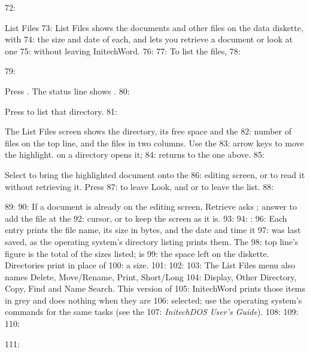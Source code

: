72: \begin{Feature}{List Files}
73: List Files shows the documents and other files on the data diskette, with
74: the size and date of each, and lets you retrieve a document or look at one
75: without leaving InitechWord.
76: 
77: To list the files,
78: \begin{WPSteps}
79: \item Press .  The status line shows .
80: \item Press  to list that directory.
81: \item The List Files screen shows the directory, its free space and the
82: number of files on the top line, and the files in two columns.  Use the
83: arrow keys to move the highlight.   on a directory opens it;
84:  returns to the one above.
85: \item Select  to bring the highlighted document onto the
86: editing screen, or  to read it without retrieving it.  Press
87:  to leave Look, and  or  to leave the list.
88: \end{WPSteps}
89: 
90: If a document is already on the editing screen, Retrieve asks ; answer  to add the file at the
92: cursor, or  to keep the screen as it is.
93: 
94: : 
96: Each entry prints the file name, its size in bytes, and the date and time it
97: was last saved, as the operating system's directory listing prints them.  The
98: top line's  figure is the total of the sizes listed;  is
99: the space left on the diskette.  Directories print  in place of
100: a size.
101: 
102: 
103: The List Files menu also names Delete, Move/Rename, Print, Short/Long
104: Display, Other Directory, Copy, Find and Name Search.  This version of
105: InitechWord prints those items in grey and does nothing when they are
106: selected; use the operating system's commands for the same tasks (see the
107: \emph{InitechDOS User's Guide}).
108: 
109: 
110: \end{Feature}
111: 
